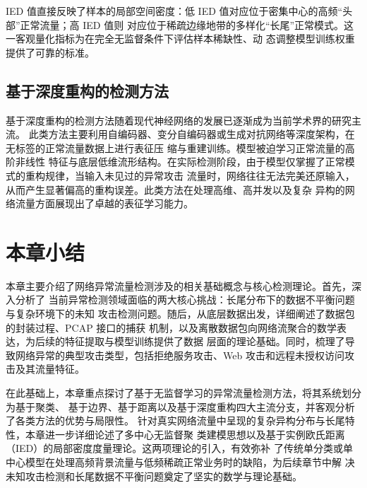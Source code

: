IED 值直接反映了样本的局部空间密度：低 IED 值对应位于密集中心的高频“头部”正常流量；高 IED 值则
对应位于稀疏边缘地带的多样化“长尾”正常模式。这一客观量化指标为在完全无监督条件下评估样本稀缺性、动
态调整模型训练权重提供了可靠的标准。

\subsection{基于深度重构的检测方法}
基于深度重构的检测方法随着现代神经网络的发展已逐渐成为当前学术界的研究主流\cite{jian2023robust}。
此类方法主要利用自编码器、变分自编码器或生成对抗网络等深度架构，在无标签的正常流量数据上进行表征压
缩与重建训练\cite{bahlali2025self,zhang2024unsupervised}。模型被迫学习正常流量的高阶非线性
特征与底层低维流形结构。在实际检测阶段，由于模型仅掌握了正常模式的重构规律，当输入未见过的异常攻击
流量时，网络往往无法完美还原输入，从而产生显著偏高的重构误差。此类方法在处理高维、高并发以及复杂
异构的网络流量方面展现出了卓越的表征学习能力。

\section{本章小结}
本章主要介绍了网络异常流量检测涉及的相关基础概念与核心检测理论。首先，深入分析了
当前异常检测领域面临的两大核心挑战：长尾分布下的数据不平衡问题与复杂环境下的未知
攻击检测问题。随后，从底层数据出发，详细阐述了数据包的封装过程、PCAP 接口的捕获
机制，以及离散数据包向网络流聚合的数学表达，为后续的特征提取与模型训练提供了数据
层面的理论基础。同时，梳理了导致网络异常的典型攻击类型，包括拒绝服务攻击、Web 
攻击和远程未授权访问攻击及其流量特征。

在此基础上，本章重点探讨了基于无监督学习的异常流量检测方法，将其系统划分为基于聚类、
基于边界、基于距离以及基于深度重构四大主流分支，并客观分析了各类方法的优势与局限性。
针对真实网络流量中呈现的复杂异构分布与长尾特性，本章进一步详细论述了多中心无监督聚
类建模思想以及基于实例欧氏距离（IED）的局部密度度量理论。这两项理论的引入，有效弥补
了传统单分类或单中心模型在处理高频背景流量与低频稀疏正常业务时的缺陷，为后续章节中解
决未知攻击检测和长尾数据不平衡问题奠定了坚实的数学与理论基础。